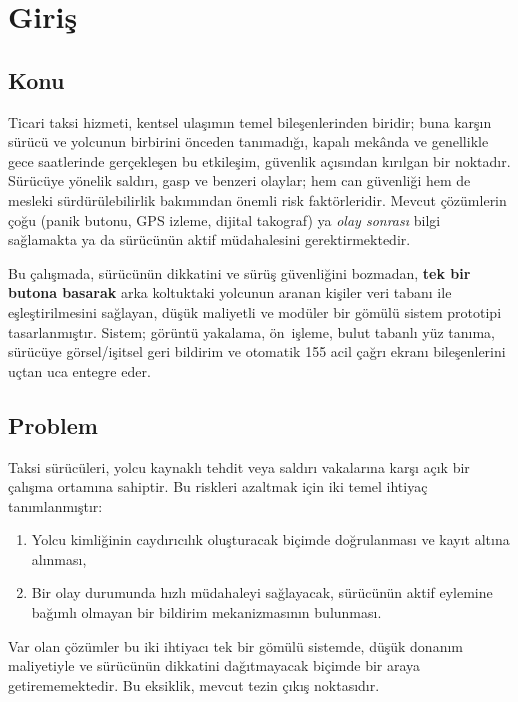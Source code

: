\chapter{Giriş}
\label{ch:giris}

\section{Konu}

Ticari taksi hizmeti, kentsel ulaşımın temel bileşenlerinden biridir;
buna karşın sürücü ve yolcunun birbirini önceden tanımadığı, kapalı
mekânda ve genellikle gece saatlerinde gerçekleşen bu etkileşim, güvenlik
açısından kırılgan bir noktadır. Sürücüye yönelik saldırı, gasp ve
benzeri olaylar; hem can güvenliği hem de mesleki sürdürülebilirlik
bakımından önemli risk faktörleridir. Mevcut çözümlerin çoğu (panik
butonu, GPS izleme, dijital takograf) ya \emph{olay sonrası} bilgi
sağlamakta ya da sürücünün aktif müdahalesini gerektirmektedir.

Bu çalışmada, sürücünün dikkatini ve sürüş güvenliğini bozmadan,
\textbf{tek bir butona basarak} arka koltuktaki yolcunun aranan kişiler
veri tabanı ile eşleştirilmesini sağlayan, düşük maliyetli ve modüler
bir gömülü sistem prototipi tasarlanmıştır. Sistem; görüntü yakalama,
ön~işleme, bulut tabanlı yüz tanıma, sürücüye görsel/işitsel geri
bildirim ve otomatik 155 acil çağrı ekranı bileşenlerini uçtan uca entegre eder.

\section{Problem}

Taksi sürücüleri, yolcu kaynaklı tehdit veya saldırı vakalarına karşı
açık bir çalışma ortamına sahiptir. Bu riskleri azaltmak için iki temel
ihtiyaç tanımlanmıştır:

\begin{enumerate}
    \item Yolcu kimliğinin caydırıcılık oluşturacak biçimde
          doğrulanması ve kayıt altına alınması,
    \item Bir olay durumunda hızlı müdahaleyi sağlayacak, sürücünün
          aktif eylemine bağımlı olmayan bir bildirim mekanizmasının
          bulunması.
\end{enumerate}

Var olan çözümler bu iki ihtiyacı tek bir gömülü sistemde, düşük
donanım maliyetiyle ve sürücünün dikkatini dağıtmayacak biçimde bir
araya getirememektedir. Bu eksiklik, mevcut tezin çıkış noktasıdır.


